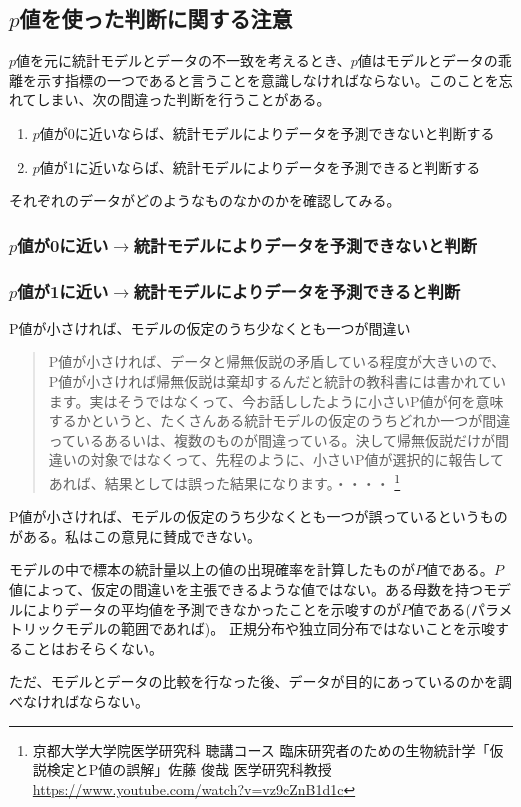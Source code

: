 \subsection{$p$値を使った判断に関する注意}
$p$値を元に統計モデルとデータの不一致を考えるとき、$p$値はモデルとデータの乖離を示す指標の一つであると言うことを意識しなければならない。このことを忘れてしまい、次の間違った判断を行うことがある。
\begin{enumerate}
    \item $p$値が0に近いならば、統計モデルによりデータを予測できないと判断する
    \item $p$値が1に近いならば、統計モデルによりデータを予測できると判断する
\end{enumerate}
それぞれのデータがどのようなものなかのかを確認してみる。
\subsubsection{$p$値が0に近い$\rightarrow$統計モデルによりデータを予測できないと判断}

\subsubsection{$p$値が1に近い$\rightarrow$統計モデルによりデータを予測できると判断}




\begin{SMbox}{P値が小さければ、モデルの仮定のうち少なくとも一つが間違い}
    \ 
    \begin{quote}
        P値が小さければ、データと帰無仮説の矛盾している程度が大きいので、P値が小さければ帰無仮説は棄却するんだと統計の教科書には書かれています。実はそうではなくって、今お話ししたように小さいP値が何を意味するかというと、たくさんある統計モデルの仮定のうちどれか一つが間違っているあるいは、複数のものが間違っている。決して帰無仮説だけが間違いの対象ではなくって、先程のように、小さいP値が選択的に報告してあれば、結果としては誤った結果になります。・・・・
        \footnote{京都大学大学院医学研究科 聴講コース 臨床研究者のための生物統計学「仮説検定とP値の誤解」佐藤 俊哉 医学研究科教授 \url{https://www.youtube.com/watch?v=vz9cZnB1d1c} }
    \end{quote}
    P値が小さければ、モデルの仮定のうち少なくとも一つが誤っているというものがある。私はこの意見に賛成できない。

    モデルの中で標本の統計量以上の値の出現確率を計算したものが$P$値である。$P$値によって、仮定の間違いを主張できるような値ではない。ある母数を持つモデルによりデータの平均値を予測できなかったことを示唆すのが$P$値である(パラメトリックモデルの範囲であれば)。
    正規分布や独立同分布ではないことを示唆することはおそらくない。

    ただ、モデルとデータの比較を行なった後、データが目的にあっているのかを調べなければならない。
\end{SMbox}


